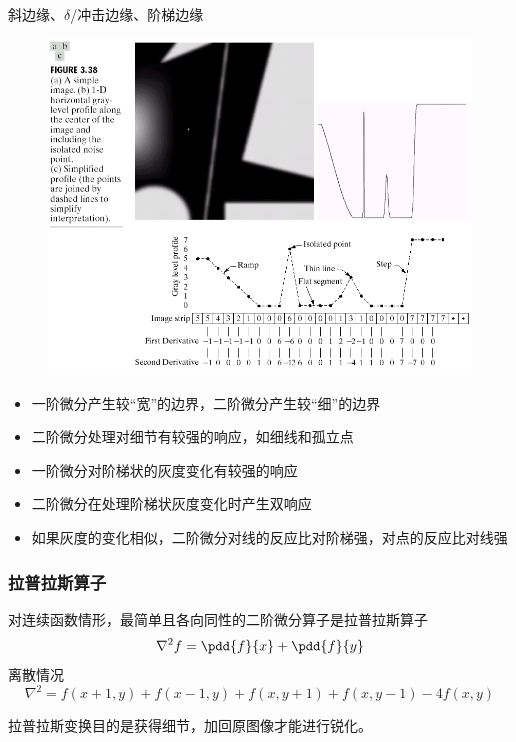 斜边缘、$\delta$/冲击边缘、阶梯边缘
\begin{figure}[H]
\centering
\includegraphics[width=0.8\linewidth]{fig/differential.png}
\end{figure}
\begin{itemize}
\item 一阶微分产生较“宽”的边界，二阶微分产生较“细”的边界
\item 二阶微分处理对细节有较强的响应，如细线和孤立点
\item 一阶微分对阶梯状的灰度变化有较强的响应
\item 二阶微分在处理阶梯状灰度变化时产生双响应
\item 如果灰度的变化相似，二阶微分对线的反应比对阶梯强，对点的反应比对线强
\end{itemize}

\subsubsection{拉普拉斯算子}
\begin{definition}
对连续函数情形，最简单且各向同性的二阶微分算子是拉普拉斯算子
\[\nabla^2 f=\pdd{f}{x}+\pdd{f}{y}\]
离散情况
\[\nabla^2=f(x+1,y)+f(x-1,y)+f(x,y+1)+f(x,y-1)-4f(x,y)\]
\end{definition}
拉普拉斯变换目的是获得细节，加回原图像才能进行锐化。

